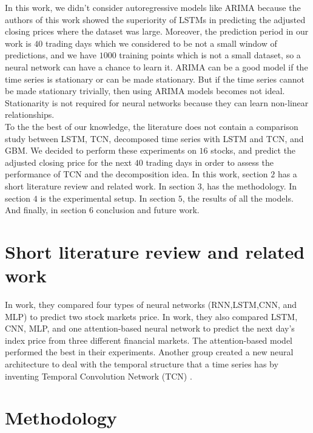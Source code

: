 \documentclass[12pt, A4]{article}
\begin{document}
In this work, we didn't consider autoregressive models like ARIMA because the authors of this work \cite{siami2018comparison} showed the superiority of LSTMs in predicting the adjusted closing prices where the dataset was large. Moreover, the prediction period in our work is $40$ trading days which we considered to be not a small window of predictions, and we have $1000$ training points which is not a small dataset, so a neural network can have a chance to learn it. ARIMA can be a good model if the time series is stationary or can be made stationary. But if the time series cannot be made stationary trivially, then using ARIMA models becomes not ideal. Stationarity is not required for neural networks because they can learn non-linear relationships. \\

To the the best of our knowledge, the literature does not contain a comparison study between LSTM, TCN, decomposed time series with LSTM and TCN, and GBM. We decided to perform these experiments on $16$ stocks, and predict the adjusted closing price for the next $40$ trading days in order to assess the performance of TCN and the decomposition idea. In this work, section $2$ has a short literature review and related work. In section $3$, has the methodology. In section $4$ is the experimental setup. In section $5$, the results of all the models. And finally, in section $6$ conclusion and future work.

\section{Short literature review and related work}

In \cite{hiransha2018nse} work, they compared four types of neural networks (RNN,LSTM,CNN, and MLP) to predict two stock markets price. In \cite{gao2020application} work, they also compared LSTM, CNN, MLP, and one attention-based neural network to predict the next day's index price from three different financial markets. The attention-based model performed the best in their experiments. Another group created a new neural architecture to deal with the temporal structure that a time series has by inventing Temporal Convolution Network (TCN)  \cite{lea2017temporal}. 
\section{Methodology}
\end{document}
